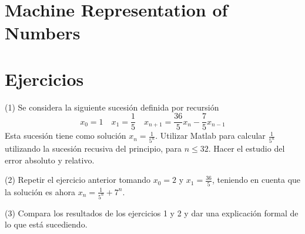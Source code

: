 \section{Machine Representation of Numbers}


\section{Ejercicios}
(1) Se considera la siguiente sucesión definida por recursión
\[x_0 = 1 \quad x_1 = \frac{1}{5} \quad x_{n+1} = \frac{36}{5} x_n - \frac{7}{5} x_{n-1}\]
Esta sucesión tiene como solución $x_n = \frac{1}{5^n}$. Utilizar Matlab para calcular $\frac{1}{5^n}$ utilizando la sucesión recusiva del principio, para $n \leq 32$. Hacer el estudio del error absoluto y  relativo.

(2) Repetir el ejercicio anterior tomando $x_0 = 2$ y $x_1 = \frac{36}{5}$, teniendo en cuenta que la solución es ahora $x_n = \frac{1}{5^n} + 7^n$.

(3) Compara los resultados de los ejercicios 1 y 2 y dar una explicación formal de lo que está sucediendo.